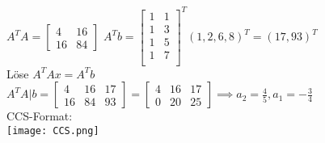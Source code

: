 \documentclass{article}
\begin{document}
	$A^TA = \begin{bmatrix}
		4 &16\\
		16 &84
	\end{bmatrix}$
	$A^Tb =\begin{bmatrix}
		1&1\\
		1&3\\
		1&5\\
		1&7\\
	\end{bmatrix}^T (1,2,6,8)^T = (17,93)^T$\\
	Löse $A^TAx = A^Tb$\\
	$A^TA|b=\begin{bmatrix}
		4 &16&17\\
		16 &84&93
	\end{bmatrix}=\begin{bmatrix}
		4 &16&17\\
		0 &20&25
	\end{bmatrix}\implies a_2 = \frac{4}{5}, a_1 = -\frac{3}{4}$\\
	CCS-Format:\\
	\texttt{[image: CCS.png]}
\end{document}
